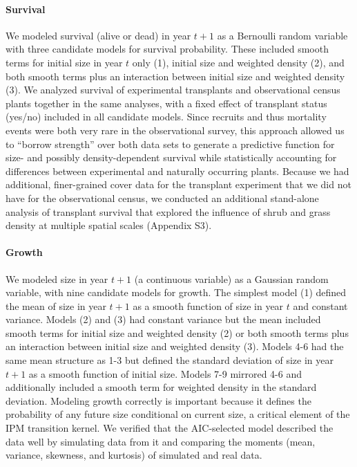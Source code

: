 \documentclass[11pt]{article}\usepackage[]{graphicx}\usepackage[usenames,dvipsnames]{xcolor}
\begin{document}
\paragraph{Survival}
We modeled survival (alive or dead) in year $t+1$ as a Bernoulli random variable with three candidate models for survival probability.
These included smooth terms for initial size in year $t$ only (1), initial size and weighted density (2), and both smooth terms plus an interaction between initial size and weighted density (3). 
We analyzed survival of experimental transplants and observational census plants together in the same analyses, with a fixed effect of transplant status (yes/no) included in all candidate models. 
Since recruits and thus mortality events were both very rare in the observational survey, this approach allowed us to ``borrow strength'' over both data sets to generate a predictive function for size- and possibly density-dependent survival while statistically accounting for differences between experimental and naturally occurring plants. 
Because we had additional, finer-grained cover data for the transplant experiment that we did not have for the observational census, we conducted an additional stand-alone analysis of transplant survival that explored the influence of shrub and grass density at multiple spatial scales (Appendix S3).

\paragraph{Growth}
We modeled size in year $t+1$ (a continuous variable) as a Gaussian random variable, with nine candidate models for growth.
The simplest model (1) defined the mean of size in year $t+1$ as a smooth function of size in year $t$ and constant variance. 
Models (2) and (3) had constant variance but the mean included smooth terms for initial size and weighted density (2) or both smooth terms plus an interaction between initial size and weighted density (3).
Models 4-6 had the same mean structure as 1-3 but defined the standard deviation of size in year $t+1$ as a smooth function of initial size. 
Models 7-9 mirrored 4-6 and additionally included a smooth term for weighted density in the standard deviation. 
Modeling growth correctly is important because it defines the probability of any future size conditional on current size, a critical element of the IPM transition kernel.
We verified that the AIC-selected model described the data well by simulating data from it and comparing the moments (mean, variance, skewness, and kurtosis) of simulated and real data.
\end{document}
